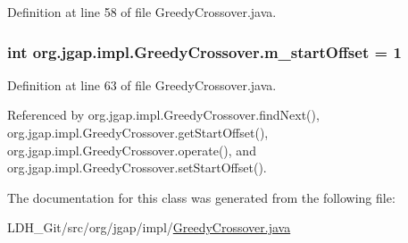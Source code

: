 Definition at line 58 of file Greedy\-Crossover.\-java.

\hypertarget{classorg_1_1jgap_1_1impl_1_1_greedy_crossover_a2c851e311ad5a263c915e01d8a30aa70}{
\subsubsection[{m\-\_\-start\-Offset}]{\setlength{\rightskip}{0pt plus 5cm}int org.\-jgap.\-impl.\-Greedy\-Crossover.\-m\-\_\-start\-Offset = 1\hspace{0.3cm}{\ttfamily [private]}}}\label{classorg_1_1jgap_1_1impl_1_1_greedy_crossover_a2c851e311ad5a263c915e01d8a30aa70}


Definition at line 63 of file Greedy\-Crossover.\-java.



Referenced by org.\-jgap.\-impl.\-Greedy\-Crossover.\-find\-Next(), org.\-jgap.\-impl.\-Greedy\-Crossover.\-get\-Start\-Offset(), org.\-jgap.\-impl.\-Greedy\-Crossover.\-operate(), and org.\-jgap.\-impl.\-Greedy\-Crossover.\-set\-Start\-Offset().



The documentation for this class was generated from the following file\-:\begin{DoxyCompactItemize}
\item 
L\-D\-H\-\_\-\-Git/src/org/jgap/impl/\hyperlink{_greedy_crossover_8java}{Greedy\-Crossover.\-java}\end{DoxyCompactItemize}
